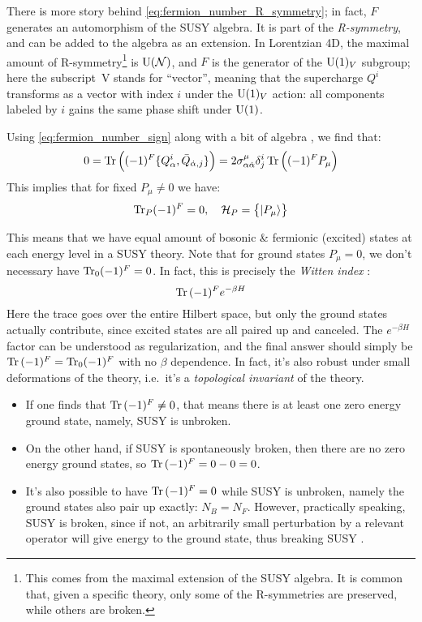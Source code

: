 \documentclass[a4paper
	,10pt
]{article}
\begin{document}
	There is more story behind \eqref{eq:fermion_number_R_symmetry}; in fact, $F$ generates an automorphism of the SUSY algebra. It is part of the \textit{R-symmetry}, and can be added to the algebra as an extension. 
	In Lorentzian 4D, the maximal amount of R-symmetry\footnote{
		This comes from the maximal extension of the SUSY algebra. It is common that, given a specific theory, only some of the R-symmetries are preserved, while others are broken. 
	} is $\mathrm{U}(\mathcal{N})$, and $F$ is the generator of the $\mathrm{U}(1)_V$ subgroup; here the \mbox{subscript V} stands for ``vector'', meaning that the supercharge $Q^i$ transforms as a vector with index $i$ under the $\mathrm{U}(1)_V$ action: all components labeled by $i$ gains the same phase shift under $\mathrm{U}(1)$. 
	
	\newparagraph
	Using \eqref{eq:fermion_number_sign} along with a bit of algebra \cite{Wess:1992cp}, we find that:
	\begin{equation}
		0 = \Tr \pqty\Big{
			(-1)^F
			\{ Q^i_\alpha, \bar{Q}_{\dot{\alpha},j} \}
		}
		= 2\sigma^\mu_{\alpha\dot{\alpha}} \delta^i_j
			\Tr \pqty\Big{
			(-1)^F P_\mu
		}
	\end{equation}
	This implies that for fixed $P_\mu \ne 0$ we have:
	\begin{equation}
		\Tr_P (-1)^F = 0,
	\quad
		\mcal{H}_P = \Bqty\big{ \ket{P_\mu} }
	\end{equation}
	
	This means that we have equal amount of bosonic \& fermionic (excited) states at each energy level in a SUSY theory. 
	Note that for ground states $P_\mu = 0$, we don't necessary have $\Tr_0 (-1)^F = 0$. In fact, this is precisely the \textit{Witten index} \cite{Witten:1982df}:
	\begin{equation}
		\Tr\,(-1)^F e^{-\beta H}
	\end{equation}
	Here the trace goes over the entire Hilbert space, but only the ground states actually contribute, since excited states are all paired up and canceled. The $e^{-\beta H}$ factor can be understood as regularization, and the final answer should simply be $\Tr\,(-1)^F = \Tr_0 (-1)^F$ with no $\beta$ dependence. In fact, it's also robust under small deformations of the theory, i.e.\ it's a \textit{topological invariant} of the theory. 
	
	\begin{itemize}
	\item If one finds that $\Tr\,(-1)^F \ne 0$, that means there is at least one zero energy ground state, namely, SUSY is unbroken. 
	
	\item On the other hand, if SUSY is spontaneously broken, then there are no zero energy ground states, so $\Tr\,(-1)^F = 0 - 0 = 0$. 
	
	\item It's also possible to have $\Tr\,(-1)^F = 0$ while SUSY is unbroken, namely the ground states also pair up exactly: $N_B = N_F$. However, practically speaking, SUSY is broken, since if not, an arbitrarily small perturbation by a relevant operator will give energy to the ground state, thus breaking SUSY \cite{Argyres:1996abc}. 
	\end{itemize}
	
\end{document}
